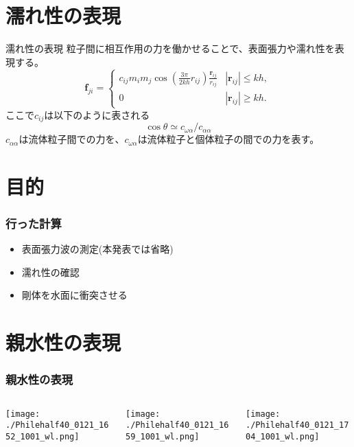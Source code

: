 \documentclass[12pt]{beamer}
\begin{document}
\section{濡れ性の表現}
\begin{frame}{濡れ性の表現}
粒子間に相互作用の力を働かせることで、表面張力や濡れ性を表現する。
\[  \bm{f}_{ji}=\begin{cases}
    c_{ij}m_im_j\cos\left(\frac{3\pi}{2kh}r_{ij}\right)\frac{\bm{r}_{ij}}{r_{ij}} & \text{$|\bm{r}_{ij}|\leq kh,$}\\
    0 & \text{$|\bm{r}_{ij}|\geq kh.$}
  \end{cases}\]
ここで$c_{ij}$は以下のように表される
\[ \cos\theta\simeq c_{\omega\alpha}/c_{\alpha\alpha}\]
$c_{\alpha\alpha}$は流体粒子間での力を、$c_{\omega\alpha}$は流体粒子と個体粒子の間での力を表す。

\end{frame}
\section{目的}
\begin{frame}\frametitle{行った計算}
  \begin{itemize}
  \item 表面張力波の測定(本発表では省略)
  \item 濡れ性の確認
  \item 剛体を水面に衝突させる
  \end{itemize}
\end{frame}

\section{親水性の表現}
\begin{frame}\frametitle{親水性の表現}
  \begin{columns}[t]
    \begin{column}{0.3\textwidth}
      \begin{center}
        \texttt{[image: ./Philehalf40\_0121\_1652\_1001\_wl.png]}
      \end{center}
    \end{column}

    \begin{column}{0.3\textwidth}
      \begin{center}
        \texttt{[image: ./Philehalf40\_0121\_1659\_1001\_wl.png]}
      \end{center}
    \end{column}

    \begin{column}{0.3\textwidth}
      \begin{center}
        \texttt{[image: ./Philehalf40\_0121\_1704\_1001\_wl.png]}
      \end{center}
    \end{column}
  \end{columns}
    
\end{frame}
\end{document}
